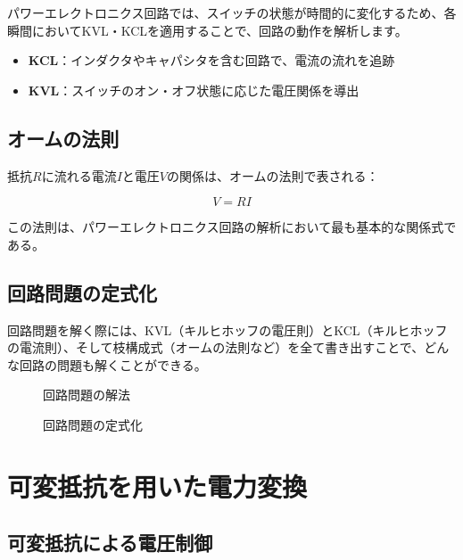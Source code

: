 パワーエレクトロニクス回路では、スイッチの状態が時間的に変化するため、各瞬間においてKVL・KCLを適用することで、回路の動作を解析します。

\begin{itemize}
\item \textbf{KCL}：インダクタやキャパシタを含む回路で、電流の流れを追跡
\item \textbf{KVL}：スイッチのオン・オフ状態に応じた電圧関係を導出
\end{itemize}

\subsection{オームの法則}

抵抗$R$に流れる電流$I$と電圧$V$の関係は、オームの法則で表される：

\begin{equation}
V = RI
\end{equation}

この法則は、パワーエレクトロニクス回路の解析において最も基本的な関係式である。

\subsection{回路問題の定式化}

回路問題を解く際には、KVL（キルヒホッフの電圧則）とKCL（キルヒホッフの電流則）、そして枝構成式（オームの法則など）を全て書き出すことで、どんな回路の問題も解くことができる。

\begin{figure}[H]
\centering
{}
\caption{回路問題の解法}
\label{fig:circuit_solution}
\end{figure}

\begin{figure}[H]
\centering
{}
\caption{回路問題の定式化}
\label{fig:circuit_formulation}
\end{figure}

\section{可変抵抗を用いた電力変換}

\subsection{可変抵抗による電圧制御}

